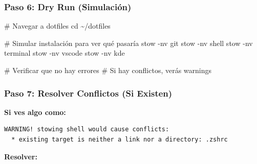 \documentclass[
  doc,
  floatsintext,
  longtable,
  a4paper,
  nolmodern,
  notxfonts,
  notimes,
  12pt,
  colorlinks=true,linkcolor=blue,citecolor=blue,urlcolor=blue]{apa7}
\newenvironment{Shaded}{\begin{snugshade}}{\end{snugshade}}
\newcommand{\AttributeTok}[1]{\textcolor[rgb]{0.40,0.45,0.13}{#1}}
\newcommand{\BuiltInTok}[1]{\textcolor[rgb]{0.00,0.23,0.31}{#1}}
\newcommand{\CommentTok}[1]{\textcolor[rgb]{0.37,0.37,0.37}{#1}}
\newcommand{\ExtensionTok}[1]{\textcolor[rgb]{0.00,0.23,0.31}{#1}}
\newcommand{\FunctionTok}[1]{\textcolor[rgb]{0.28,0.35,0.67}{#1}}
\newcommand{\NormalTok}[1]{\textcolor[rgb]{0.00,0.23,0.31}{#1}}
\newcommand{\VariableTok}[1]{\textcolor[rgb]{0.07,0.07,0.07}{#1}}
\begin{document}
\subsubsection{Paso 6: Dry Run
(Simulación)}\label{paso-6-dry-run-simulaciuxf3n}

\begin{Shaded}
\begin{Highlighting}[]
\CommentTok{\# Navegar a dotfiles}
\BuiltInTok{cd}\NormalTok{ \textasciitilde{}/dotfiles}

\CommentTok{\# Simular instalación para ver qué pasaría}
\ExtensionTok{stow} \AttributeTok{{-}nv}\NormalTok{ git}
\ExtensionTok{stow} \AttributeTok{{-}nv}\NormalTok{ shell}
\ExtensionTok{stow} \AttributeTok{{-}nv}\NormalTok{ terminal}
\ExtensionTok{stow} \AttributeTok{{-}nv}\NormalTok{ vscode}
\ExtensionTok{stow} \AttributeTok{{-}nv}\NormalTok{ kde}

\CommentTok{\# Verificar que no hay errores}
\CommentTok{\# Si hay conflictos, verás warnings}
\end{Highlighting}
\end{Shaded}

\subsubsection{Paso 7: Resolver Conflictos (Si
Existen)}\label{paso-7-resolver-conflictos-si-existen}

\textbf{Si ves algo como:}

\begin{verbatim}
WARNING! stowing shell would cause conflicts:
  * existing target is neither a link nor a directory: .zshrc
\end{verbatim}

\textbf{Resolver:}

\begin{Shaded}
\end{Shaded}
\end{document}
